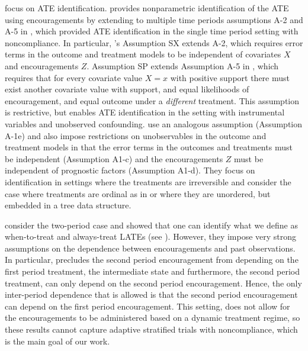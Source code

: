 \cite{han2021identification,heckman2007dynamic,heckman2016dynamic} focus on ATE identification.
\cite{han2021identification} provides nonparametric identification of the ATE using encouragements by extending to multiple time periods assumptions A-2 and A-5 in \cite{vytlacil2007dummy}, which provided ATE identification in the single time period setting with noncompliance.
In particular, \cite{han2021identification}'s Assumption SX extends A-2, which requires error terms in the outcome and treatment models to be independent of covariates $X$ and encouragements $Z$.
Assumption SP extends Assumption A-5 in \cite{vytlacil2007dummy}, which requires that for every covariate value $X = x$ with positive support there must exist another covariate value with support, and equal likelihoods of encouragement, and equal outcome under a \textit{different} treatment.
This assumption is restrictive, but enables ATE identification in the setting with instrumental variables and unobserved confounding.
\cite{heckman2016dynamic} use an analogous assumption (Assumption A-1e) and also impose restrictions on unobservables in the outcome and treatment models in that the error terms in the outcomes and treatments must be independent (Assumption A1-c) and the encouragements $Z$ must be independent of prognostic factors (Assumption A1-d).
They focus on identification in settings where the treatments are irreversible and consider the case where treatments are ordinal as in \cite{heckman2007dynamic} or where they are unordered, but embedded in a tree data structure.

\cite{miquel2002identification} consider the two-period case and showed that one can identify what we define as when-to-treat and always-treat LATEs (see \citealp[Theorem~7]{miquel2002identification}). However, they impose very strong assumptions on the dependence between encouragements and past observations.
In particular, \citep[Assumption~11]{miquel2002identification} precludes the second period encouragement from depending on the first period treatment, the intermediate state and furthermore, the second period treatment, can only depend on the second period encouragement. Hence, the only inter-period dependence that is allowed is that the second period encouragement can depend on the first period encouragement.
This setting, does not allow for the encouragements to be administered based on a dynamic treatment regime, so these results cannot capture adaptive stratified trials with noncompliance, which is the main goal of our work.

